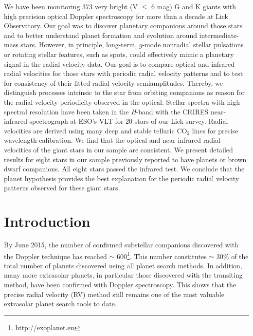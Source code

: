 \documentclass{aa}
\begin{document}
  \abstract
   {We have been monitoring 373 very bright (V $\leq$ 6 mag) G and K giants
 with high precision optical Doppler spectroscopy for more than a decade at Lick Observatory.
 Our goal was to discover planetary companions around those stars and 
 to better understand planet formation and evolution around intermediate-mass stars. 
  However, in principle, long-term, $g$-mode nonradial stellar pulsations or rotating 
  stellar features, such as spots, could effectively mimic a planetary signal in the radial velocity data. }
  {Our goal is to compare optical and infrared radial velocities for those stars with periodic radial 
   velocity patterns and to test for
   consistency  of their fitted radial velocity semiamplitudes. Thereby, we distinguish
   processes intrinsic to the star 
   from orbiting companions as reason for the radial velocity periodicity observed in the optical.}
   {Stellar spectra with high spectral resolution have been taken in the \textit{H}-band with the 
   CRIRES near-infrared spectrograph at ESO's VLT for 20 stars of our Lick survey. 
    Radial velocities are derived using 
    many deep and stable telluric CO$_2$ lines for precise wavelength calibration.}
   {We find that the optical and  near-infrared radial velocities of the giant stars in our sample are 
    consistent. We present detailed results for eight stars in our sample previously reported to have planets or
    brown dwarf companions.
    All eight stars passed the infrared test.}
    {We conclude that the
    planet hypothesis provides the best explanation for the periodic radial velocity patterns
    observed for these giant stars.}
 
    

   \maketitle


\section{Introduction}


By June 2015, the number of confirmed substellar companions discovered with the 
Doppler technique has reached $\sim$ 600\footnote{http://exoplanet.eu}.
This number constitutes $\sim$ 30\% of the total number of planets discovered using all planet search methods.
In addition, many more extrasolar planets, in particular those discovered with
the transiting method, have been confirmed with Doppler spectroscopy.
This shows that the precise radial velocity (RV) method still remains one of the most valuable
extrasolar planet search tools to date. 
\end{document}
